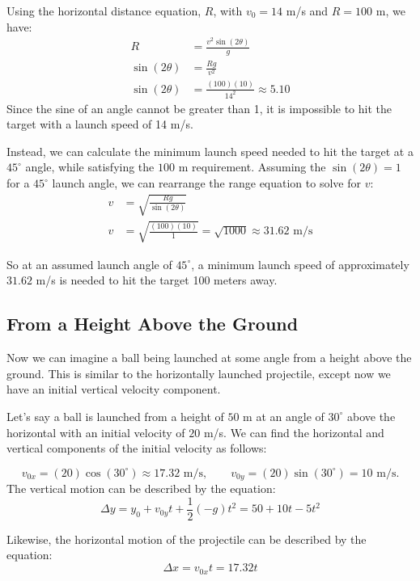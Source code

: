 \begin{Answer}[ref=projectiles_angle3]

Using the horizontal distance equation, $R$, with $v_0 = 14$ m/s and $R = 100$ m, we have:
\begin{align*}
R&=\frac{v^2\sin(2\theta)}{g} \\ 
\sin(2\theta) &= \frac{Rg}{v^2} \\
\sin(2\theta) &= \frac{(100)(10)}{14^2} \approx 5.10
\end{align*}
Since the sine of an angle cannot be greater than 1, it is impossible to hit the target with a launch speed of 14 m/s.

Instead, we can calculate the minimum launch speed needed to hit the target at a $45^\circ$ angle, while satisfying the $100$ m requirement. Assuming the $\sin(2\theta) = 1$ for a $45^\circ$ launch angle, we can rearrange the range equation to solve for $v$:
\begin{align*}
v &= \sqrt{\frac{Rg}{\sin(2\theta)}} \\
v &= \sqrt{\frac{(100)(10)}{1}} = \sqrt{1000} \approx 31.62 \text{ m/s}
\end{align*}

So at an assumed launch angle of $45^\circ$, a minimum launch speed of approximately $31.62$ m/s is needed to hit the target 100 meters away.
\end{Answer}




\subsection{From a Height Above the Ground}
Now we can imagine a ball being launched at some angle from a height above the ground. This is similar to the horizontally launched projectile, except now we have an initial vertical velocity component.

Let's say a ball is launched from a height of $50$ m at an angle of $30^\circ$ above the horizontal with an initial velocity of $20$ m/s. We can find the horizontal and vertical components of the initial velocity as follows:


$$v_{0x} = (20) \cos(30^\circ) \approx 17.32 \text{ m/s}, \qquad v_{0y} = (20) \sin(30^\circ) = 10 \text{ m/s}.$$
The vertical motion can be described by the equation:
\[\Delta y = y_0 + v_{0y} t + \frac{1}{2} (-g) t^2 = 50+ 10t - 5t^2\]

Likewise, the horizontal motion of the projectile can be described by the equation:
\[\Delta x = v_{0x} t = 17.32t\]

